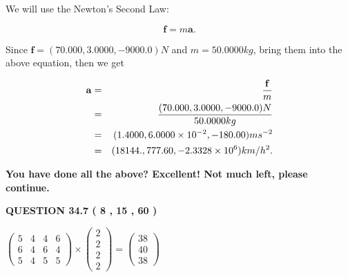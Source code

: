 \documentclass[12pt]{article}
\begin{document}
 
 
 
 
 
\noindent{}

We will use the Newton's Second Law:
 
\[
\mathbf{f}=m\mathbf{a}.
\]
 
Since $\mathbf{f}=( %
70.000,  %
3.0000,  %
-9000.0 )N$
and $m= %
50.0000kg$, bring them into the above equation, then we get
 
\begin{eqnarray*}
\mathbf{a}&=&\frac{\mathbf{f}}m  \\
&=&\frac{(
70.000 ,
3.0000 ,
-9000.0 )N
}{ %
50.0000 kg}  \\
&=&(
1.4000 ,
6.0000 \times 10^{-2},
-180.00
)ms^{-2} \\
&=&(
18144. ,
777.60 ,
-2.3328 \times 10^{6}
)km/h^2.
\end{eqnarray*}
 
 
 
   
   
\vspace{0.3in}
{\textbf{\LARGE{You have done all the above? Excellent! Not much left, please continue.}}}
\vspace{0.3in}
   
   
  
\vspace{0.2in}
  
{\textbf{\Large{QUESTION
34.7 
 (           8 ,          15 ,          60 )
}}}
  
  
 
 
\noindent{}

 
$\left( \begin{array}{ccccccccccccccc}
           5  & 
           4  & 
           4  & 
           6  \\ 
           6  & 
           4  & 
           6  & 
           4  \\ 
           5  & 
           4  & 
           5  & 
           5
\end{array}\right) \times
\left( \begin{array}{c}
           2  \\ 
           2  \\ 
           2  \\ 
           2
\end{array}\right)  =
\left( \begin{array}{c}
          38  \\ 
          40  \\ 
          38
\end{array}\right)  $
 
\end{document}

